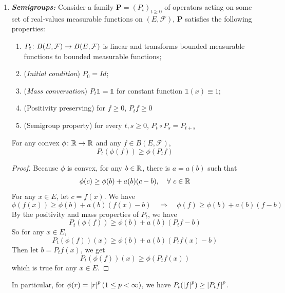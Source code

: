 \begin{enumerate}[label=\arabic{*}.]
	\item \emph{\textbf{Semigroups:}} Consider a family $\mathbf{P} = (P_t)_{t \geq 0}$ of operators acting on some set of real-values measurable functions on $(E,\mathcal{F})$, $\mathbf{P}$ satisfies the following properties:
	\begin{enumerate}[label=(\roman*)]
		\item $P_t \colon B(E,\mathcal{F}) \rightarrow B(E,\mathcal{F})$ is linear and transforms bounded measurable functions to bounded measurable functions;
		\item (\emph{Initial condition}) $P_0 = Id$;
		\item (\emph{Mass conversation}) $P_t\mathds{1} = \mathds{1}$ for constant function $\mathds{1}(x) \equiv 1$;
		\item (Positivity preserving) for $f \geq 0$, $P_tf \geq 0$
		\item (Semigroup property) for every $t,s \geq 0$, $P_t \circ P_s = P_{t+s}$
	\end{enumerate}
	\begin{cor}
	    For any convex $\phi \colon \mathbb{R} \rightarrow \mathbb{R}$ and any $f \in B(E,\mathcal{F})$,
	    \begin{equation*}
	        P_t(\phi(f)) \geq \phi(P_tf)
	    \end{equation*}
	\end{cor}
	\begin{proof}
	    Because $\phi$ is convex, for any $b \in \mathbb{R}$, there is $a = a(b)$ such that
	    \begin{equation*}
	        \phi(c) \geq \phi(b) + a(b)(c - b),\quad \forall~c \in \mathbb{R}
	    \end{equation*}
	    For any $x \in E$, let $c = f(x)$. We have
	    \begin{equation*}
	        \phi(f(x)) \geq \phi(b) + a(b)(f(x) - b)\quad \Rightarrow \quad \phi(f) \geq \phi(b) + a(b)(f - b)
	    \end{equation*}
	    By the positivity and mass properties of $P_t$, we have
	    \begin{equation*}
	        P_t(\phi(f)) \geq \phi(b) + a(b)(P_tf - b)
	    \end{equation*}
	    So for any $x \in E$,
	    \begin{equation*}
	         P_t(\phi(f))(x) \geq \phi(b) + a(b)(P_tf(x) - b)
	    \end{equation*}
	    Then let $b = P_tf(x)$, we get
	    \begin{equation*}
	        P_t(\phi(f))(x) \geq \phi(P_tf(x))
	    \end{equation*}
	    which is true for any $x \in E$.
	\end{proof}
	In particular, for $\phi(r) = \left\lvert r\right\lvert^p(1 \leq p < \infty)$, we have $P_t(\left\lvert f\right\lvert^p) \geq \left\lvert P_tf\right\lvert^p$.


\end{enumerate}
